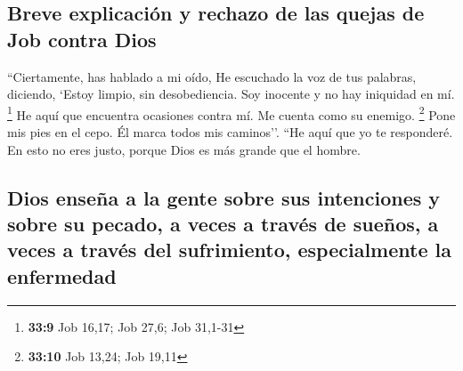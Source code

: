 \hypertarget{breve-explicaciuxf3n-y-rechazo-de-las-quejas-de-job-contra-dios}{%
\subsection{Breve explicación y rechazo de las quejas de Job contra
Dios}\label{breve-explicaciuxf3n-y-rechazo-de-las-quejas-de-job-contra-dios}}

 ``Ciertamente, has hablado a mi oído, He escuchado la voz
de tus palabras, diciendo,  `Estoy limpio, sin
desobediencia. Soy inocente y no hay iniquidad en mí. \footnote{\textbf{33:9}
  Job 16,17; Job 27,6; Job 31,1-31}  He aquí que
encuentra ocasiones contra mí. Me cuenta como su enemigo. \footnote{\textbf{33:10}
  Job 13,24; Job 19,11}  Pone mis pies en el cepo. Él
marca todos mis caminos''.  ``He aquí que yo te
responderé. En esto no eres justo, porque Dios es más grande que el
hombre.

\hypertarget{dios-enseuxf1a-a-la-gente-sobre-sus-intenciones-y-sobre-su-pecado-a-veces-a-travuxe9s-de-sueuxf1os-a-veces-a-travuxe9s-del-sufrimiento-especialmente-la-enfermedad}{%
\subsection{Dios enseña a la gente sobre sus intenciones y sobre su
pecado, a veces a través de sueños, a veces a través del sufrimiento,
especialmente la
enfermedad}\label{dios-enseuxf1a-a-la-gente-sobre-sus-intenciones-y-sobre-su-pecado-a-veces-a-travuxe9s-de-sueuxf1os-a-veces-a-travuxe9s-del-sufrimiento-especialmente-la-enfermedad}}

